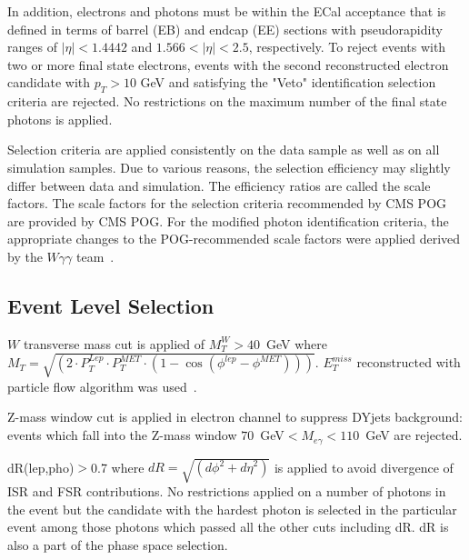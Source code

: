In addition, electrons and photons must be within the ECal acceptance that is defined in terms of barrel (EB) and endcap (EE) sections with pseudorapidity ranges of $|\eta| < 1.4442$ and $1.566 < |\eta| < 2.5$, respectively. To reject events with two or more final state electrons, events with the second reconstructed electron candidate with $p_T>10$ GeV and satisfying the "Veto" identification selection criteria are rejected. No restrictions on the maximum number of the final state photons is applied. 

Selection criteria are applied consistently on the data sample as well as on all simulation samples. Due to various reasons, the selection efficiency may slightly differ between data and simulation. The efficiency ratios are called the scale factors. The scale factors for the selection criteria recommended by CMS POG are provided by CMS POG. For the modified photon identification criteria, the appropriate changes to the POG-recommended scale factors were applied derived by the $W\gamma\gamma$ team~\cite{Wgg8TeV}.



\subsection{Event Level Selection}

$W$ transverse mass cut is applied of $M_T^W>40$~GeV where $M_T=\sqrt{(2 \cdot P_T^{Lep} \cdot P_T^{MET} \cdot (1-\cos{(\phi^{lep}-\phi^{MET})}))}$. $E_T^{miss}$ reconstructed with particle flow algorithm was used~\cite{pfMET}. 

Z-mass window cut is applied in electron channel to suppress DYjets background: events which fall into the Z-mass window $70$~GeV$<M_{e\gamma}<110$~GeV are rejected.

dR(lep,pho)$>$0.7 where $dR=\sqrt{({d\phi}^2+{d\eta}^2)}$ is applied to avoid divergence of ISR and FSR contributions. No restrictions applied on a number of  photons in the event but the candidate with the hardest photon is selected in the particular event among         
those photons which passed all the other cuts including dR. dR is also a part of the phase space selection.

